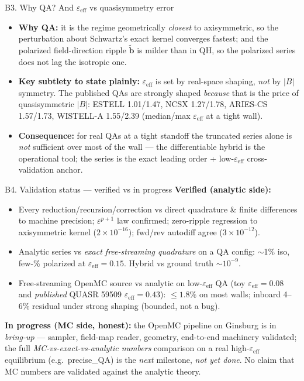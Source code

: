 \documentclass[aspectratio=169]{beamer}
\newcommand{\bperp}{\tilde{\bm{b}}}
\newcommand{\eps}{\varepsilon}
\begin{document}
\begin{frame}{B3. Why QA? And $\eps_{\mathrm{eff}}$ vs quasisymmetry error}
  \small
  \begin{itemize}
    \item \textbf{Why QA:} it is the regime geometrically \emph{closest} to axisymmetric, so the
      perturbation about Schwartz's exact kernel converges fastest; and the polarized field-direction
      ripple $\bperp$ is milder than in QH, so the polarized series does not lag the isotropic one.
    \item \textbf{Key subtlety to state plainly:} $\eps_{\mathrm{eff}}$ is set by real-space shaping,
      \emph{not} by $|B|$ symmetry. The published QAs are strongly shaped \emph{because} that is the
      price of quasisymmetric $|B|$: ESTELL 1.01/1.47, NCSX 1.27/1.78, ARIES-CS 1.57/1.73, WISTELL-A
      1.55/2.39 (median/max $\eps_{\mathrm{eff}}$ at a tight wall).
    \item \textbf{Consequence:} for real QAs at a tight standoff the truncated series alone is
      \emph{not} sufficient over most of the wall --- the differentiable hybrid is the operational
      tool; the series is the exact leading order + low-$\eps_{\mathrm{eff}}$ cross-validation anchor.
  \end{itemize}
\end{frame}

\begin{frame}{B4. Validation status --- verified vs in progress}
  \small
  \textbf{Verified (analytic side):}
  \begin{itemize}
    \item Every reduction/recursion/correction vs direct quadrature \& finite differences to machine
      precision; $\eps^{p+1}$ law confirmed; zero-ripple regression to axisymmetric kernel
      ($2\times10^{-16}$); fwd/rev autodiff agree ($3\times10^{-12}$).
    \item Analytic series vs \emph{exact free-streaming quadrature} on a QA config: $\sim$1\% iso,
      few-\% polarized at $\eps_{\mathrm{eff}}=0.15$. Hybrid vs ground truth $\sim10^{-9}$.
    \item Free-streaming OpenMC source vs analytic on low-$\eps_{\mathrm{eff}}$ QA (toy
      $\eps_{\mathrm{eff}}\!=\!0.08$ and \emph{published} QUASR 59509 $\eps_{\mathrm{eff}}\!=\!0.43$):
      $\le1.8\%$ on most walls; inboard 4--6\% residual under strong shaping (bounded, not a bug).
  \end{itemize}
  \textbf{In progress (MC side, honest):} the OpenMC pipeline on Ginsburg is in \emph{bring-up} ---
  sampler, field-map reader, geometry, end-to-end machinery validated; the full
  \emph{MC-vs-exact-vs-analytic numbers} comparison on a real high-$\eps_{\mathrm{eff}}$ equilibrium
  (e.g.\ precise\_QA) is the \emph{next} milestone, \emph{not yet done}. No claim that MC numbers are
  validated against the analytic theory.
\end{frame}
\end{document}
